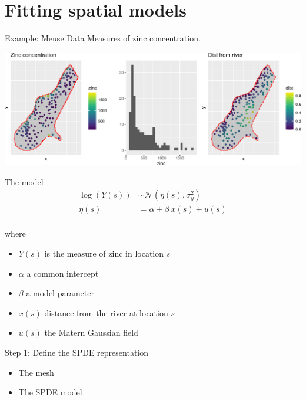 \documentclass[
  ignorenonframetext,
]{beamer}
\begin{document}
\hypertarget{fitting-spatial-models}{%
\section{Fitting spatial models}\label{fitting-spatial-models}}

\begin{frame}{Example: Meuse Data}
\protect\hypertarget{example-meuse-data}{}
Measures of zinc concentration.

\begin{center}\includegraphics[width=0.6\linewidth,height=0.5\textheight]{Part3_Spatial_files/figure-beamer/unnamed-chunk-9-1} \end{center}
\end{frame}

\begin{frame}{The model}
\protect\hypertarget{the-model}{}
\[
\begin{aligned}
\log(Y(s)) &\sim \mathcal{N}(\eta(s),\sigma^2_y)\\
\eta(s)& = \alpha + \beta\ x(s) + u(s)\\
\end{aligned}
\]

where

\begin{itemize}
\item
  \(Y(s)\) is the measure of zinc in location \(s\)
\item
  \(\alpha\) a common intercept
\item
  \(\beta\) a model parameter
\item
  \(x(s)\) distance from the river at location \(s\)
\item
  \(u(s)\) the Matern Gaussian field
\end{itemize}
\end{frame}

\begin{frame}{Step 1: Define the SPDE representation}
\protect\hypertarget{step-1-define-the-spde-representation}{}
\begin{itemize}
\item
  The mesh
\item
  The SPDE model
\end{itemize}
\end{frame}
\end{document}
